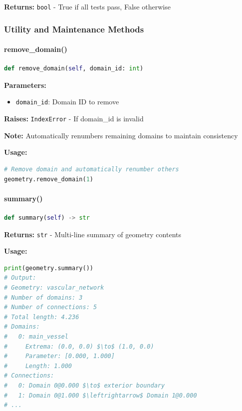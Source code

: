 \textbf{Returns:} \texttt{bool} - True if all tests pass, False otherwise

\subsubsection{Utility and Maintenance Methods}

\paragraph{remove\_domain()}\leavevmode
\begin{lstlisting}[language=Python, caption=Remove Domain Method]
def remove_domain(self, domain_id: int)
\end{lstlisting}

\textbf{Parameters:}
\begin{itemize}
    \item \texttt{domain\_id}: Domain ID to remove
\end{itemize}

\textbf{Raises:} \texttt{IndexError} - If domain\_id is invalid

\textbf{Note:} Automatically renumbers remaining domains to maintain consistency

\textbf{Usage:}
\begin{lstlisting}[language=Python]
# Remove domain and automatically renumber others
geometry.remove_domain(1)
\end{lstlisting}

\paragraph{summary()}\leavevmode
\begin{lstlisting}[language=Python, caption=Summary Generation Method]
def summary(self) -> str
\end{lstlisting}

\textbf{Returns:} \texttt{str} - Multi-line summary of geometry contents

\textbf{Usage:}
\begin{lstlisting}[language=Python]
print(geometry.summary())
# Output:
# Geometry: vascular_network
# Number of domains: 3
# Number of connections: 5
# Total length: 4.236
# Domains:
#   0: main_vessel
#     Extrema: (0.0, 0.0) $\to$ (1.0, 0.0)
#     Parameter: [0.000, 1.000]
#     Length: 1.000
# Connections:
#   0: Domain 0@0.000 $\to$ exterior boundary
#   1: Domain 0@1.000 $\leftrightarrow$ Domain 1@0.000
# ...
\end{lstlisting}

